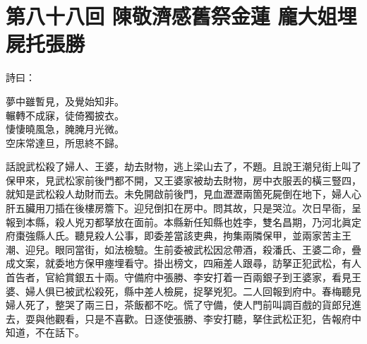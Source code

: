 
\chapter*{第八十八回 陳敬濟感舊祭金蓮 龐大姐埋屍托張勝}


詩曰：

\begin{myquote}
夢中雖暫見，及覺始知非。\\輾轉不成寐，徒倚獨披衣。\\悽悽曉風急，腌腌月光微。\\空床常達旦，所思終不歸。
\end{myquote}

話說武松殺了婦人、王婆，劫去財物，逃上梁山去了，不題。且說王潮兒街上叫了保甲來，見武松家前後門都不開，又王婆家被劫去財物，房中衣服丟的橫三豎四，就知是武松殺人劫財而去。未免開啟前後門，見血瀝瀝兩箇死屍倒在地下，婦人心肝五臟用刀插在後樓房簷下。迎兒倒扣在房中。問其故，只是哭泣。{}次日早衙，呈報到本縣，殺人兇刃都拏放在面前。本縣新任知縣也姓李，雙名昌期，乃河北眞定府棗強縣人氏。聽見殺人公事，即委差當該吏典，拘集兩隣保甲，並兩家苦主王潮、迎兒。眼同當街，如法檢驗。生前委被武松因忿帶酒，殺潘氏、王婆二命，疊成文案，就委地方保甲瘞埋看守。掛出榜文，四廂差人跟尋，訪拏正犯武松，有人首告者，官給賞銀五十兩。守備府中張勝、李安打着一百兩銀子到王婆家，看見王婆、婦人俱已被武松殺死，縣中差人檢屍，捉拏兇犯。二人回報到府中。春梅聽見婦人死了，整哭了兩三日，茶飯都不吃。慌了守備，使人門前叫調百戲的貨郎兒進去，耍與他觀看，只是不喜歡。日逐使張勝、李安打聽，拏住武松正犯，告報府中知道，不在話下。


